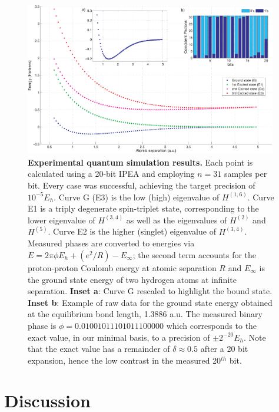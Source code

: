 \documentclass[11pt,oneside,final]{huthesis}%
\begin{document}
\begin{figure}
	\begin{center}
	\includegraphics[width=11cm]{./figures/experiment_results}
	\end{center}
	\caption{\textbf{Experimental quantum simulation results.} Each point
	is calculated using a 20-bit IPEA and employing $n=31$ samples per bit.
	Every case was successful, achieving the target precision of $10^{-5}E_h$. Curve
	G (E3) is the low (high) eigenvalue of $H^{(1,6)}$. Curve E1 is a triply degenerate spin-triplet
	state, corresponding to the lower eigenvalue of $H^{(3,4)}$ as well as the eigenvalues of 
	$H^{(2)}$ and $H^{(5)}$.  Curve E2 is the higher (singlet) eigenvalue of $H^{(3,4)}$.
Measured phases are converted to energies via 
$E = 2\pi \phi E_{h} + (e^2/R) - E_\infty$;
the second term accounts for the proton-proton Coulomb energy at atomic separation $R$ and 
$E_\infty$ is the ground state energy
of two hydrogen atoms at infinite separation. \textbf{Inset a}: Curve G rescaled to highlight
the bound state. \textbf{Inset b}: Example of raw data for the ground state energy 
obtained at the equilibrium bond length, 1.3886 a.u. The measured binary phase is $
\phi=0.01001011101011100000$ which corresponds to the exact value, in our minimal basis, to a 
precision of ${\pm} 2^{-20} E_{h}$. Note that the exact value has a remainder of $\delta 
\approx 0.5$ after a 20 bit expansion, hence the low contrast in the measured 20$^{{th}}$
bit.
	\label{fig:results}}
\end{figure}


\section{Discussion}
\end{document}
